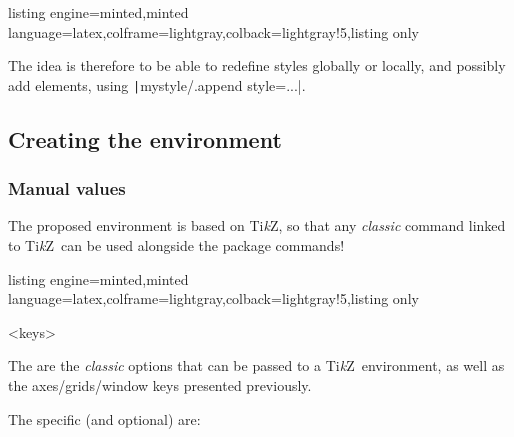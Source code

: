\documentclass[11pt,a4paper]{ltxdoc}
\providecommand\tikzlogo{Ti\textit{k}Z}
\let\TikZ\tikzlogo
\begin{document}
\begin{tcblisting}{listing engine=minted,minted language=latex,colframe=lightgray,colback=lightgray!5,listing only}
\end{tcblisting}

The idea is therefore to be able to redefine styles globally or locally, and possibly add elements, using \texttt|mystyle/.append style={...}|.

\subsection{Creating the environment}\label{creaenvt}

\subsubsection{Manual values}

The proposed environment is based on \TikZ, so that any \textit{classic} command linked to \TikZ\ can be used alongside the package commands!

\begin{tcblisting}{listing engine=minted,minted language=latex,colframe=lightgray,colback=lightgray!5,listing only}
\begin{GraphTikz}<keys>
\end{GraphTikz}
\end{tcblisting}

The  are the \textit{classic} options that can be passed to a \TikZ\ environment, as well as the \textsf{axes/grids/window} keys presented previously.

\smallskip

The specific (and optional)  are:
\end{document}
